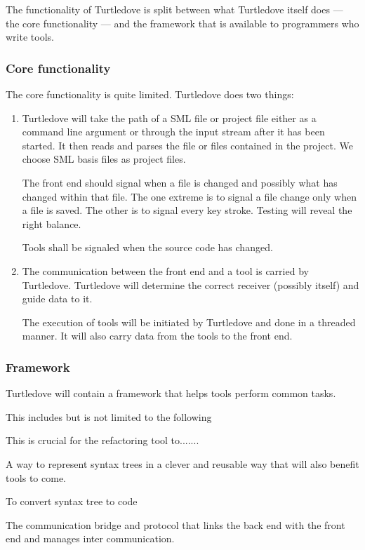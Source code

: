 \documentclass[a4paper,oneside]{article}
\begin{document}
The functionality of Turtledove is split between what Turtledove itself does --- the core
functionality --- and the framework that is available to programmers who write tools.
\subsubsection{Core functionality}
The core functionality is quite limited. Turtledove does two things:
\begin{enumerate}
\item Turtledove will take the path of a SML file or project file either as a command line argument
      or through the input stream after it has been started. It then reads and parses the file or
      files contained in the project. We choose SML basis files as project files.

      The front end should signal when a file is changed and possibly what has changed within that
      file. The one extreme is to signal a file change only when a file is saved. The other is to
      signal every key stroke. Testing will reveal the right balance.

      Tools shall be signaled when the source code has changed.

\item The communication between the front end and a tool is carried by Turtledove. Turtledove will
      determine the correct receiver (possibly itself) and guide data to it.

      The execution of tools will be initiated by Turtledove and done in a threaded manner. It will
      also carry data from the tools to the front end.
\end{enumerate}

\subsubsection{Framework}
Turtledove will contain a framework that helps tools perform common tasks.

This includes but is not limited to the following

\begin{description}
\item[Parsing] This is crucial for the refactoring tool to.......

\item[Syntax tree representation] A way to represent syntax trees in a clever and reusable way
  that will also benefit tools to come.

\item[Pretty printing] To convert syntax tree to code

\item[Serializing] The communication bridge and protocol that links the back
  end with the front end and manages inter communication.
\end{description}
\end{document}
